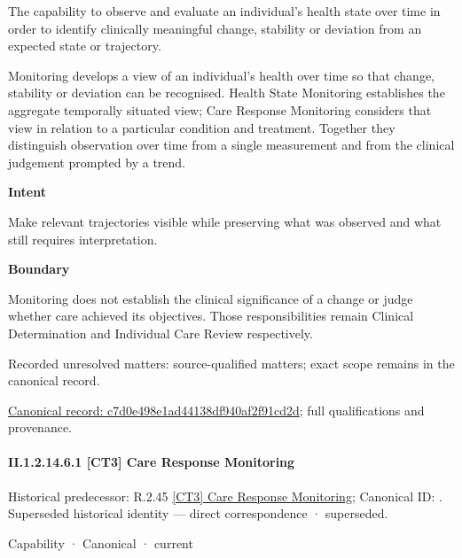 The capability to observe and evaluate an individual's health state over time in order to identify clinically meaningful change, stability or deviation from an expected state or trajectory.



Monitoring develops a view of an individual's health over time so that change, stability or deviation can be recognised. Health State Monitoring establishes the aggregate temporally situated view; Care Response Monitoring considers that view in relation to a particular condition and treatment. Together they distinguish observation over time from a single measurement and from the clinical judgement prompted by a trend.



\textbf{Intent}



Make relevant trajectories visible while preserving what was observed and what still requires interpretation.



\textbf{Boundary}



Monitoring does not establish the clinical significance of a change or judge whether care achieved its objectives. Those responsibilities remain Clinical Determination and Individual Care Review respectively.


{\small Recorded unresolved matters: source-qualified matters; exact scope remains in the canonical record.}\par
{\footnotesize \href{../../../../continuum/strategy/capability/c7d0e498e1ad44138df940af2f91cd2d.md}{Canonical record: c7d0e498e1ad44138df940af2f91cd2d}; full qualifications and provenance.}\par
\paragraph*{II.1.2.14.6.1 [CT3] Care Response Monitoring}
\label{navigation:II.1.2.14.6.1}

{\small Historical predecessor: R.2.45 \hyperref[element:615f93d05fbb4a8481f07778bd4f4803]{[CT3] Care Response Monitoring}; Canonical ID: \texttt{}. Superseded historical identity — direct correspondence · superseded.}\par
\label{element:d6951c9357fa40a4943cde581d95d5b1}
{\small Capability · Canonical · current}\par

